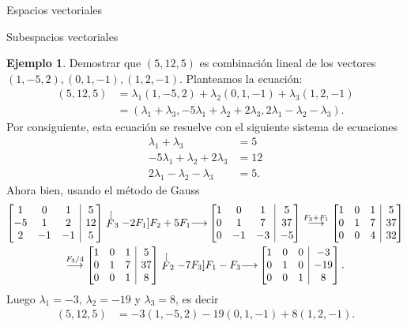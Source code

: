 \documentclass[a4paper,12pt,twoside,spanish,reqno]{amsbook}
\theoremstyle{definition}
\newtheorem{ejemplo}{Ejemplo}[section]
\theoremstyle{remark}
\begin{document}
\begin{chapter}{Espacios vectoriales}
\begin{section}{Subespacios vectoriales}
\begin{ejemplo} Demostrar que $(5,12,5)$  es combinación lineal de los vectores $(1,-5,2), (0,1,-1), (1,2,-1)$. Planteamos la ecuación:
    \begin{align*}
        (5,12,5) &= \lambda_1(1,-5,2)+\lambda_2 (0,1,-1)+\lambda_3 (1,2,-1) 
        \\&= (\lambda_1+\lambda_3,-5\lambda_1+\lambda_2+2\lambda_3,2\lambda_1-\lambda_2-\lambda_3).
    \end{align*}
    Por consiguiente,  esta ecuación se resuelve con el siguiente sistema de ecuaciones
    \begin{align*}
        \lambda_1+\lambda_3 &= 5 \\
        -5\lambda_1+\lambda_2+2\lambda_3 &= 12 \\
        2\lambda_1-\lambda_2-\lambda_3 &= 5.
    \end{align*}
    Ahora bien, usando el método de Gauss
                        \begin{multline*}
    \left[\begin{array}{@{}*{3}{c}|c@{}}1 & 0 & 1 &  5 \\ -5 & 1 & 2 &  12 \\	2 & -1 & -1 &  5  \end{array}\right]
    \stackrel[F_3 -2F_1]{F_2 + 5F_1}{\longrightarrow} 
    \left[\begin{array}{@{}*{3}{c}|c@{}}1 & 0 & 1 &  5 \\ 0 & 1 & 7 &  37 \\	0 & -1 & -3 &  -5  \end{array}\right]
    \stackrel{F_3+F_1}{\longrightarrow} 
    \left[\begin{array}{@{}*{3}{c}|c@{}}1 & 0 & 1 &  5 \\ 0 & 1 & 7 &  37 \\	0 & 0 & 4 & 32  \end{array}\right]
    \\
    \stackrel{F_3/4}{\longrightarrow} 
    \left[\begin{array}{@{}*{3}{c}|c@{}}1 & 0 & 1 & 5 \\ 0 & 1 & 7 & 37 \\	0 & 0 & 1& 8  \end{array}\right]
    \stackrel[F_2 -7F_3]{F_1 - F_3}{\longrightarrow}
    \left[\begin{array}{@{}*{3}{c}|c@{}}1 & 0 & 0 & -3 \\ 0 & 1 & 0 &  -19 \\	0 & 0 & 1& 8  \end{array}\right].
    \end{multline*}	
    Luego $\lambda_1= -3$, $\lambda_2 = -19$ y $\lambda_3=8$,  es decir
    \begin{align*}
    (5,12,5) &= -3(1,-5,2)-19 (0,1,-1)+8 (1,2,-1).
    \end{align*}
\end{ejemplo}


\end{section}
\end{chapter}
\end{document}
